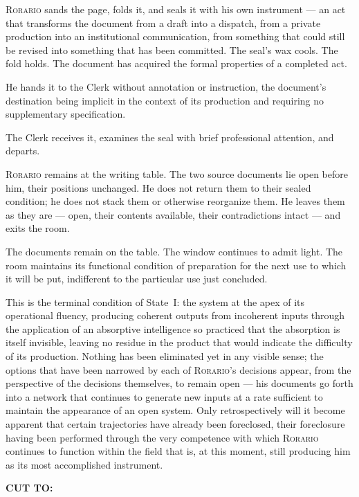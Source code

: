 \documentclass[12pt, oneside]{article}
\newenvironment{action}{%
  \vspace{0.6em}%
  \noindent\ignorespaces%
}{%
  \par\vspace{0.6em}%
}
\newcommand{\transition}[1]{%
  \vspace{0.8em}%
  \begin{flushright}%
    \bfseries #1%
  \end{flushright}%
  \vspace{0.5em}%
}
\begin{document}
\begin{action}
\textsc{Rorario} sands the page, folds it, and seals it with his own instrument --- an act that transforms the document from a draft into a dispatch, from a private production into an institutional communication, from something that could still be revised into something that has been committed. The seal's wax cools. The fold holds. The document has acquired the formal properties of a completed act.

He hands it to the Clerk without annotation or instruction, the document's destination being implicit in the context of its production and requiring no supplementary specification.

The Clerk receives it, examines the seal with brief professional attention, and departs.

\textsc{Rorario} remains at the writing table. The two source documents lie open before him, their positions unchanged. He does not return them to their sealed condition; he does not stack them or otherwise reorganize them. He leaves them as they are --- open, their contents available, their contradictions intact --- and exits the room.

The documents remain on the table. The window continues to admit light. The room maintains its functional condition of preparation for the next use to which it will be put, indifferent to the particular use just concluded.

This is the terminal condition of State~I: the system at the apex of its operational fluency, producing coherent outputs from incoherent inputs through the application of an absorptive intelligence so practiced that the absorption is itself invisible, leaving no residue in the product that would indicate the difficulty of its production. Nothing has been eliminated yet in any visible sense; the options that have been narrowed by each of \textsc{Rorario}'s decisions appear, from the perspective of the decisions themselves, to remain open --- his documents go forth into a network that continues to generate new inputs at a rate sufficient to maintain the appearance of an open system. Only retrospectively will it become apparent that certain trajectories have already been foreclosed, their foreclosure having been performed through the very competence with which \textsc{Rorario} continues to function within the field that is, at this moment, still producing him as its most accomplished instrument.
\end{action}

\transition{CUT TO:}
\end{document}
